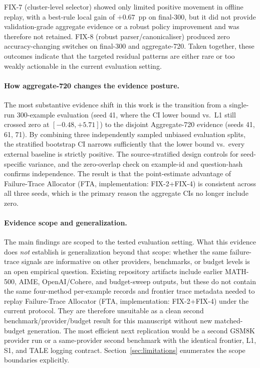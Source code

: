 FIX-7 (cluster-level selector) showed only limited positive movement in offline replay,
with a best-rule local gain of $+0.67$~pp on final-300, but it did not provide
validation-grade aggregate evidence or a robust policy improvement and was therefore
not retained.
FIX-8 (robust parser/canonicaliser) produced zero accuracy-changing switches on
final-300 and aggregate-720.
Taken together, these outcomes indicate that the targeted residual patterns are either
rare or too weakly actionable in the current evaluation setting.

\paragraph{How aggregate-720 changes the evidence posture.}
The most substantive evidence shift in this work is the transition from a single-run
300-example evaluation (seed 41, where the CI lower bound vs.\ L1 still crossed zero
at $[-0.48, +5.71]$) to the disjoint Aggregate-720 evidence (seeds 41, 61, 71).
By combining three independently sampled unbiased evaluation splits, the stratified
bootstrap CI narrows sufficiently that the lower bound vs.\ every external baseline
is strictly positive.
The source-stratified design controls for
seed-specific variance, and the zero-overlap check on example-id and question-hash
confirms independence.
The result is that the point-estimate advantage of Failure-Trace Allocator (FTA, implementation: FIX-2+FIX-4) is consistent across
all three seeds, which is the primary reason the aggregate CIs no longer include zero.

\paragraph{Evidence scope and generalization.}
The main findings are scoped to the tested evaluation setting.
What this evidence does \emph{not} establish is generalization beyond that scope:
whether the same failure-trace signals are informative on other providers,
benchmarks, or budget levels is an open empirical question.
Existing repository artifacts include earlier MATH-500, AIME, OpenAI/Cohere, and
budget-sweep outputs, but these do not contain the same four-method per-example
records and frontier trace metadata needed to replay Failure-Trace Allocator (FTA, implementation: FIX-2+FIX-4) under the current
protocol.
They are therefore unsuitable as a clean second benchmark/provider/budget result
for this manuscript without new matched-budget generation.
The most efficient next replication would be a second GSM8K provider run or a
same-provider second benchmark with the identical frontier, L1, S1, and TALE
logging contract.
Section~\ref{sec:limitations} enumerates the scope boundaries explicitly.
